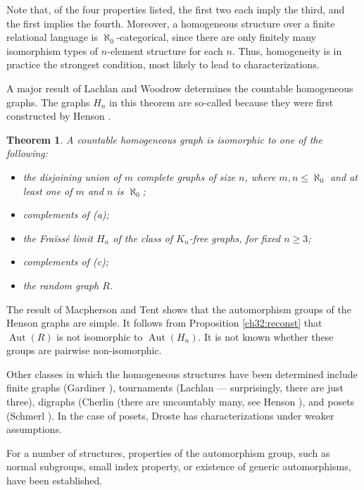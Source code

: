 \documentclass{book}
\newtheorem{theorem}{Theorem}
\DeclareMathOperator{\Aut}{Aut}
\begin{document}
Note that, of the four properties listed, the first two each imply
the third, and the first implies the fourth. Moreover, a homogeneous
structure over a finite relational language is
$\aleph_0$-categorical, since there are only finitely many
isomorphism types of $n$-element structure for each $n$. Thus,
homogeneity is in practice the strongest condition, most likely to
lead to characterizations.

A major result of Lachlan and Woodrow \cite{ch32:bib35} determines
the countable homogeneous graphs. The graphs $H_n$ in this theorem are
so-called because they were first constructed by Henson \cite{ch32:bib26}.

\begin{theorem}\label{ch32:them10.1} 
A countable homogeneous graph is isomorphic to one of the following:
\begin{itemize}
\item[(a)] the disjoining union of $m$ complete graphs of size $n$, where $m, n \leq \aleph_0$ and at
least one of $m$ and $n$ is $\aleph_0$;
\item[(b)] complements of (a);
\item[(c)] the Fra\"{i}ss\'{e} limit $H_n$ of the class of $K_n$-free graphs, for fixed $n \geq 3$;
\item[(d)] complements of (c);
\item[(e)] the random graph $R$.
\end{itemize}
\end{theorem}

The result of Macpherson and Tent \cite{ch32:new11} shows that the
automorphism groups of the Henson graphs are simple.
It follows from Proposition \ref{ch32:reconst} that $\Aut(R)$ is not
isomorphic to $\Aut(H_n)$. It is
not known whether these groups are pairwise non-isomorphic.

Other classes in which the homogeneous structures have been
determined include finite graphs (Gardiner \cite{ch32:bib23}),
tournaments (Lachlan \cite{ch32:bib34} --- surprisingly, there are
just three), digraphs (Cherlin \cite{ch32:bib12} (there are 
uncountably many, see Henson \cite{ch32:bib27}), and posets (Schmerl
\cite{ch32:bib45}). In the case of posets, Droste \cite{ch32:bib14} has
characterizations under weaker assumptions.

For a number of structures, properties of the automorphism group,
such as normal subgroups, small index property, or existence of
generic automorphisms, have been established.
\end{document}
